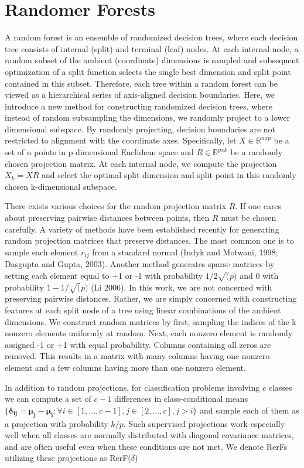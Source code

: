 \documentclass{article} %
\begin{document}
\section{Randomer Forests}
A random forest is an ensemble of randomized decision trees, where each decision tree consists of internal (split) and terminal (leaf) nodes. At each internal node, a random subset of the ambient (coordinate) dimensions is sampled and subsequent optimization of a split function selects the single best dimension and split point contained in this subset. Therefore, each tree within a random forest can be viewed as a hierarchical series of axis-aligned decision boundaries. Here, we introduce a new method for constructing randomized decision trees, where instead of random subsampling the dimensions, we randomly project to a lower dimensional subspace. By randomly projecting, decision boundaries are not restricted to alignment with the coordinate axes. Specifically, let $X \in \mathbb{R}^{nxp}$ be a set of n points in p dimensional Euclidean space and $R \in \mathbb{R}^{pxk}$ be a randomly chosen projection matrix. At each internal node, we compute the projection $X_k = XR$ and select the optimal split dimension and split point in this randomly chosen k-dimensional subspace.

There exists various choices for the random projection matrix $R$. If one cares about preserving pairwise distances between points, then $R$ must be chosen carefully. A variety of methods have been established recently for generating random projection matrices that preserve distances. The most common one is to sample each element $r_{ij}$ from a standard normal (Indyk and Motwani, 1998; Dasgupta and Gupta, 2003). Another method generates sparse matrices by setting each element equal to +1 or -1 with probability $1/2\sqrt(p)$ and 0 with probability $1 - 1/\sqrt(p)$ (Li 2006). In this work, we are not concerned with preserving pairwise distances. Rather, we are simply concerned with constructing features at each split node of a tree using linear combinations of the ambient dimensions. We construct random matrices by first, sampling the indices of the k nonzero elements uniformly at random. Next, each nonzero element is randomly assigned -1 or +1 with equal probability. Columns containing all zeros are removed. This results in a matrix with many columns having one nonzero element and a few columns having more than one nonzero element.

In addition to random projections, for classification problems involving $c$ classes we can compute a set of $c-1$ differences in class-conditional means $\{\boldsymbol{\delta_{ij}} = \boldsymbol{\mu_j} - \boldsymbol{\mu_i}: \forall i \in [1,...,c-1], j \in [2,...,c], j>i\}$ and sample each of them as a projection with probability $k/p$. Such supervised projections work especially well when all classes are normally distributed with diagonal covariance matrices, and are often useful even when these conditions are not met. We denote RerFs utilizing these projections as RerF($\delta$)
\end{document}
